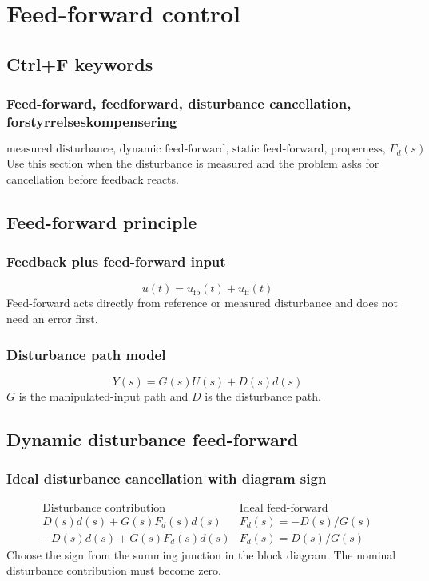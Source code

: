 \section{Feed-forward control}

\subsection{Ctrl+F keywords}

\subsubsection{Feed-forward, feedforward, disturbance cancellation, forstyrrelseskompensering}
\[
\text{measured disturbance, dynamic feed-forward, static feed-forward, properness, }F_d(s)
\]
Use this section when the disturbance is measured and the problem asks for cancellation before feedback reacts.

\subsection{Feed-forward principle}

\subsubsection{Feedback plus feed-forward input}
\[
u(t)=u_{\mathrm{fb}}(t)+u_{\mathrm{ff}}(t)
\]
Feed-forward acts directly from reference or measured disturbance and does not need an error first.

\subsubsection{Disturbance path model}
\[
Y(s)=G(s)U(s)+D(s)d(s)
\]
\(G\) is the manipulated-input path and \(D\) is the disturbance path.

\subsection{Dynamic disturbance feed-forward}

\subsubsection{Ideal disturbance cancellation with diagram sign}
\[
\begin{array}{c|c}
\text{Disturbance contribution} & \text{Ideal feed-forward}\\ \hline
D(s)d(s)+G(s)F_d(s)d(s) & F_d(s)=-D(s)/G(s)\\
-D(s)d(s)+G(s)F_d(s)d(s) & F_d(s)=D(s)/G(s)
\end{array}
\]
Choose the sign from the summing junction in the block diagram. The nominal disturbance contribution must become zero.


